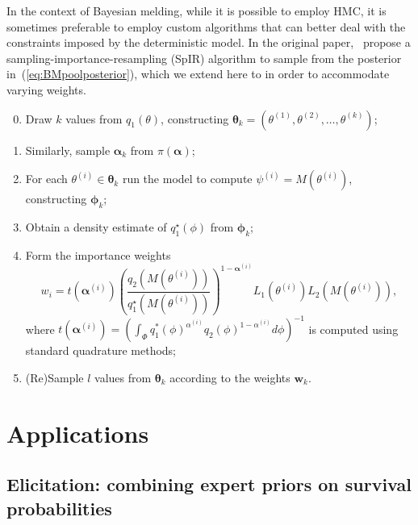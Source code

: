 \documentclass[a4paper, notitlepage, 10pt]{article}
\begin{document}
In the context of Bayesian melding, while it is possible to employ HMC, it is sometimes preferable to employ custom algorithms that can better deal with the constraints imposed by the deterministic model.
In the original paper,~\cite[sec. 3.4]{Poole2000} propose a sampling-importance-resampling (SpIR) algorithm to sample from the posterior in~(\ref{eq:BMpoolposterior}), which we extend here to in order to accommodate varying weights.
\begin{enumerate}
\setcounter{enumi}{-1}
 \item Draw $k$ values from  $q_1(\theta)$, constructing $\boldsymbol \theta_k = (\theta^{(1)}, \theta^{(2)}, \ldots, \theta^{(k)} )$;
 \item Similarly, sample $\boldsymbol \alpha_k$ from $\pi(\boldsymbol \alpha)$;
 \item For each $\theta^{(i)} \in \boldsymbol\theta_k$ run the model to compute $\psi^{(i)} = M(\theta^{(i)})$, constructing $\boldsymbol \phi_k$;
 \item Obtain a density estimate of $q_1^\star(\phi)$ from  $\boldsymbol \phi_k$;
 \item Form the importance weights 
 \begin{equation}
 \label{eq:SpIRweights}
  w_i = t\left(\boldsymbol \alpha^{(i)}\right) \left(\frac{q_2(M(\theta^{(i)}))}{q_1^\star(M(\theta^{(i)}))}\right)^{1 - \boldsymbol \alpha^{(i)}} L_1(\theta^{(i)}) L_2(M(\theta^{(i)})),
 \end{equation}
where $t\left(\boldsymbol \alpha^{(i)}\right) = \left( \int_{\Phi} q_1^\ast(\phi)^{\alpha^{(i)}} q_2(\phi)^{1-\alpha^{(i)}} d\phi \right)^{-1}$ is computed using standard quadrature methods;
 \item (Re)Sample $l$ values from $\boldsymbol \theta_k$ according to the weights $\boldsymbol w_k$.
\end{enumerate}

\section{Applications}
\label{sec:apps}

\subsection{Elicitation: combining expert priors on survival probabilities}
\label{sec:survivalProbs}
\end{document}
